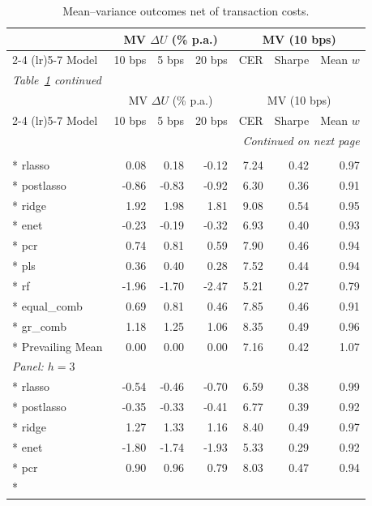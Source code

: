 \medskip
\begingroup
\setlength{\LTpost}{0.5\baselineskip}
\setlength{\tabcolsep}{4pt}
\begin{longtable}{lrrrrrr}
\caption{Mean--variance outcomes net of transaction costs.}\label{tab:table3_mv} \\
\toprule
& \multicolumn{3}{c}{MV $\Delta U$ (\% p.a.)} & \multicolumn{3}{c}{MV (10 bps)} \\
\cmidrule(lr){2-4} \cmidrule(lr){5-7}
Model & 10 bps & 5 bps & 20 bps & CER & Sharpe & Mean $w$ \\
\midrule
\endfirsthead
\multicolumn{7}{l}{\emph{Table~\ref{tab:table3_mv} continued}} \\
\toprule
& \multicolumn{3}{c}{MV $\Delta U$ (\% p.a.)} & \multicolumn{3}{c}{MV (10 bps)} \\
\cmidrule(lr){2-4} \cmidrule(lr){5-7}
Model & 10 bps & 5 bps & 20 bps & CER & Sharpe & Mean $w$ \\
\midrule
\endhead
\midrule
\multicolumn{7}{r}{\emph{Continued on next page}} \\
\endfoot
\bottomrule
\endlastfoot
\multicolumn{7}{l}{\emph{Panel: $h=1$}} \\*
rlasso & 0.08 & 0.18 & -0.12 & 7.24 & 0.42 & 0.97 \\*
postlasso & -0.86 & -0.83 & -0.92 & 6.30 & 0.36 & 0.91 \\*
ridge & 1.92 & 1.98 & 1.81 & 9.08 & 0.54 & 0.95 \\*
enet & -0.23 & -0.19 & -0.32 & 6.93 & 0.40 & 0.93 \\*
pcr & 0.74 & 0.81 & 0.59 & 7.90 & 0.46 & 0.94 \\*
pls & 0.36 & 0.40 & 0.28 & 7.52 & 0.44 & 0.94 \\*
rf & -1.96 & -1.70 & -2.47 & 5.21 & 0.27 & 0.79 \\*
equal\_comb & 0.69 & 0.81 & 0.46 & 7.85 & 0.46 & 0.91 \\*
gr\_comb & 1.18 & 1.25 & 1.06 & 8.35 & 0.49 & 0.96 \\*
Prevailing Mean & 0.00 & 0.00 & 0.00 & 7.16 & 0.42 & 1.07 \\
\multicolumn{7}{l}{\emph{Panel: $h=3$}} \\*
rlasso & -0.54 & -0.46 & -0.70 & 6.59 & 0.38 & 0.99 \\*
postlasso & -0.35 & -0.33 & -0.41 & 6.77 & 0.39 & 0.92 \\*
ridge & 1.27 & 1.33 & 1.16 & 8.40 & 0.49 & 0.97 \\*
enet & -1.80 & -1.74 & -1.93 & 5.33 & 0.29 & 0.92 \\*
pcr & 0.90 & 0.96 & 0.79 & 8.03 & 0.47 & 0.94 \\*

\end{longtable}
